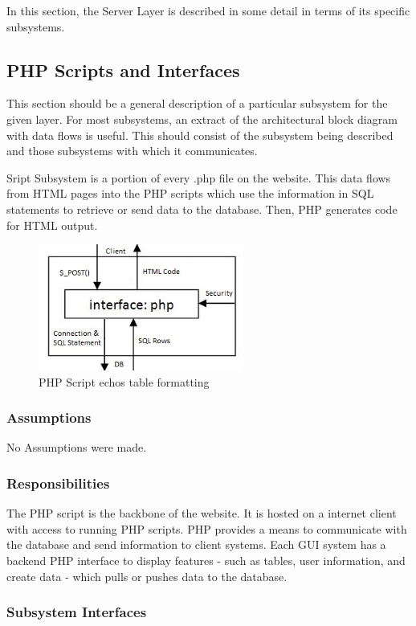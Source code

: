 In this section, the Server Layer is described in some detail in terms of its specific subsystems.

\subsection{PHP Scripts and Interfaces}
This section should be a general description of a particular subsystem for the given layer. For most subsystems, an extract of the architectural block diagram with data flows is useful. This should consist of the subsystem being described and those subsystems with which it communicates. 

Sript Subsystem is a portion of every .php file on the website. This data flows from HTML pages into the PHP scripts which use the information in SQL statements to retrieve or send data to the database. Then, PHP generates code for HTML output.


\begin{figure}[h!]
	\centering
 	\includegraphics[width=0.60\textwidth]{images/PHPScriptSubsystem}
 \caption{PHP Script echos table formatting}
\end{figure}

\subsubsection{Assumptions}
No Assumptions were made.

\subsubsection{Responsibilities}
The PHP script is the backbone of the website. It is hosted on a internet client with access to running PHP scripts. PHP provides a means to communicate with the database and send information to client systems. Each GUI system has a backend PHP interface to display features - such as tables, user information, and create data - which pulls or pushes data to the database.

\subsubsection{Subsystem Interfaces}

